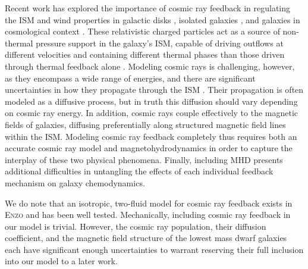 \documentclass[twocolumn]{aastex61}
\begin{document}
Recent work has explored the importance of cosmic ray feedback in regulating the ISM and wind properties in galactic disks \citep{Hanasz2013,GirichidisCR,Simpson2016,Farber2017}, isolated galaxies \citep{SalemBryanCorlies,Salem2015,Pakmor2016,Ruszkowski2017}, and galaxies in cosmological context \citep{SalemBryanHummels}. These relativistic charged particles act as a source of non-thermal pressure support in the galaxy's ISM, capable of driving outflows at different velocities and containing different thermal phases than those driven through thermal feedback alone \citep{SalemBryanCorlies}. Modeling cosmic rays is challenging, however, as they encompass a wide range of energies,
   and there are
significant uncertainties in how they propagate through the ISM \citep[e.g.][]{Wiener2017}. Their propagation is often modeled as a diffusive process, but in truth this diffusion should vary depending on cosmic ray energy. In addition, cosmic rays couple effectively to the magnetic fields of galaxies, diffusing preferentially along structured magnetic field lines within the ISM. Modeling cosmic ray feedback completely thus requires both an accurate cosmic ray model and magnetohydrodynamics in order to capture the interplay of these two physical phenomena. Finally, including MHD presents additional difficulties in untangling the effects of each individual feedback mechanism on galaxy chemodynamics.

We do note that an isotropic, two-fluid model for cosmic ray feedback exists in  \textsc{Enzo} \citep{SalemBryan2014,Salem2015} and has been well tested. Mechanically, including cosmic ray feedback in our model is trivial. However, the cosmic ray population, their diffusion coefficient, and the magnetic field structure of the lowest mass dwarf galaxies each have significant enough uncertainties to warrant reserving their full inclusion into our model to a later work.

\end{document}
